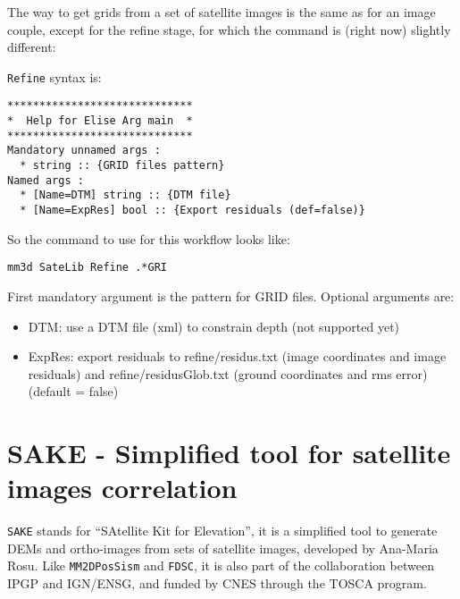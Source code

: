 The way to get grids from a set of satellite images is the same as for an image couple, except for the refine stage, for which the command is (right now) slightly different:

{\tt Refine} syntax is:

\begin{verbatim}
*****************************
*  Help for Elise Arg main  *
*****************************
Mandatory unnamed args :
  * string :: {GRID files pattern}
Named args :
  * [Name=DTM] string :: {DTM file}
  * [Name=ExpRes] bool :: {Export residuals (def=false)}
\end{verbatim}

So the command to use for this workflow looks like:
\begin{verbatim}
mm3d SateLib Refine .*GRI
\end{verbatim}

First mandatory argument is the pattern for GRID files. Optional arguments are:
\begin{itemize}
\item DTM: use a DTM file (xml) to constrain depth (not supported yet)
\item ExpRes: export residuals to refine/residus.txt (image coordinates and image residuals) and refine/residusGlob.txt (ground coordinates and rms error) (default = false)
\end{itemize}

\section{SAKE - Simplified tool for satellite images correlation}

{\tt SAKE} stands for ``SAtellite Kit for Elevation'', it is a simplified tool to generate DEMs and ortho-images from sets of satellite images, developed by Ana-Maria Rosu. Like {\tt MM2DPosSism} and {\tt FDSC}, it is also part of the collaboration between IPGP and IGN/ENSG, and funded by CNES through the TOSCA program.

